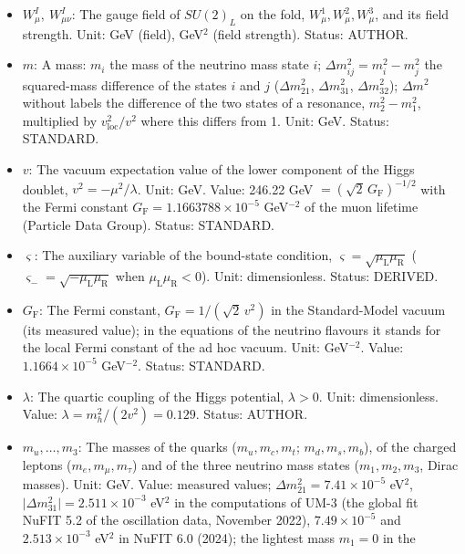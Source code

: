 \documentclass[
  10pt,
]{article}
\begin{document}
\begin{itemize}
  strength). Status: AUTHOR.
\item
  \(W^I_\mu,\ W^I_{\mu\nu}\): The gauge field of \(SU(2)_L\) on the
  fold, \(W^1_\mu, W^2_\mu, W^3_\mu\), and its field strength. Unit: GeV
  (field), GeV\(^2\) (field strength). Status: AUTHOR.
\item
  \(m\): A mass: \(m_i\) the mass of the neutrino mass state \(i\);
  \(\Delta m_{ij}^2 = m_i^2 - m_j^2\) the squared-mass difference of the
  states \(i\) and \(j\) (\(\Delta m_{21}^2\), \(\Delta m_{31}^2\),
  \(\Delta m_{32}^2\)); \(\Delta m^2\) without labels the difference of
  the two states of a resonance, \(m_2^2 - m_1^2\), multiplied by
  \(v_{\mathrm{loc}}^2/v^2\) where this differs from 1. Unit: GeV.
  Status: STANDARD.
\item
  \(v\): The vacuum expectation value of the lower component of the
  Higgs doublet, \(v^2 = -\mu^2/\lambda\). Unit: GeV. Value: 246.22 GeV
  \(= (\sqrt2\,G_{\mathrm{F}})^{-1/2}\) with the Fermi constant
  \(G_{\mathrm{F}} = 1.1663788\times10^{-5}\) GeV\(^{-2}\) of the muon
  lifetime (Particle Data Group). Status: STANDARD.
\item
  \(\varsigma\): The auxiliary variable of the bound-state condition,
  \(\varsigma = \sqrt{\mu_{\mathrm{L}}\mu_{\mathrm{R}}}\)
  (\(\varsigma_- = \sqrt{-\mu_{\mathrm{L}}\mu_{\mathrm{R}}}\) when
  \(\mu_{\mathrm{L}}\mu_{\mathrm{R}} < 0\)). Unit: dimensionless.
  Status: DERIVED.
\item
  \(G_{\mathrm{F}}\): The Fermi constant,
  \(G_{\mathrm{F}} = 1/(\sqrt2\,v^2)\) in the Standard-Model vacuum (its
  measured value); in the equations of the neutrino flavours it stands
  for the local Fermi constant of the ad hoc vacuum. Unit: GeV\(^{-2}\).
  Value: \(1.1664\times10^{-5}\) GeV\(^{-2}\). Status: STANDARD.
\item
  \(\lambda\): The quartic coupling of the Higgs potential,
  \(\lambda > 0\). Unit: dimensionless. Value:
  \(\lambda = m_h^2/(2v^2) = 0.129\). Status: AUTHOR.
\item
  \(m_u, \dots, m_3\): The masses of the quarks (\(m_u, m_c, m_t\);
  \(m_d, m_s, m_b\)), of the charged leptons (\(m_e, m_\mu, m_\tau\))
  and of the three neutrino mass states (\(m_1, m_2, m_3\), Dirac
  masses). Unit: GeV. Value: measured values;
  \(\Delta m_{21}^2 = 7.41\times10^{-5}\) eV\(^2\),
  \(\lvert\Delta m_{31}^2\rvert = 2.511\times10^{-3}\) eV\(^2\) in the
  computations of UM-3 (the global fit NuFIT 5.2 of the oscillation
  data, November 2022), \(7.49\times10^{-5}\) and \(2.513\times10^{-3}\)
  eV\(^2\) in NuFIT 6.0 (2024); the lightest mass \(m_1 = 0\) in the

\end{itemize}
\end{document}
